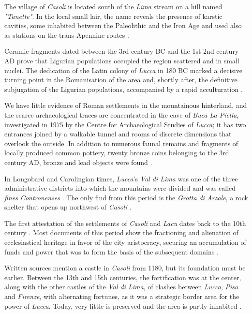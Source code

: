 \documentclass[sustainability,article,submit,pdftex,moreauthors]{Definitions/mdpi}
\begin{document}
 The village of \emph{Casoli} is located south of the \emph{Lima} stream on a hill named {\em "Tanette"}. In the local small lair, the name reveals the presence of karstic cavities, some inhabited between the Paleolithic and the Iron Age and used also as stations on the trans-Apennine routes \cite{men76, gia96, pal63, zec72a, zec72b}.

Ceramic fragments dated between the 3rd century BC and the 1st-2nd century AD prove that Ligurian populations occupied the region scattered and in small nuclei. The dedication of the Latin colony of \textit{Lucca} in 180 BC marked a decisive turning point in the Romanisation of the area and, shortly after, the definitive subjugation of the Ligurian populations, accompanied by a rapid acculturation \cite{gia96, cia05}.

We have little evidence of Roman settlements in the mountainous hinterland, and the scarce archaeological traces are concentrated in the cave of \textit{Buca La Piella}, investigated in 1975 by the Centre for Archaeological Studies of \emph{Lucca}; it has two entrances joined by a walkable tunnel and rooms of discrete dimensions that overlook the outside. In addition to numerous faunal remains and fragments of locally produced common pottery, twenty bronze coins belonging to the 3rd century AD, bronze and lead objects were found \cite{gia96, men81, cia03}. 

In Longobard and Carolingian times, \emph{Lucca}'s \emph{Val di Lima} was one of the three administrative districts into which the mountains were divided and was called \emph{fines Contronenses} \cite{qui02, cia06, cia11}. The only find from this period is the \textit{Grotta di Arzale}, a rock shelter that opens up northwest of \emph{Casoli} \cite{gia96}.

The first attestation of the settlements of \emph{Casoli} and \emph{Lacu} dates back to the 10th century \cite{gia96}. Most documents of this period show the fractioning and alienation of ecclesiastical heritage in favor of the city aristocracy, securing an accumulation of funds and power that was to form the basis of the subsequent domains \cite{qui02, gia96, for12, for15}.

Written sources mention a castle in \emph{Casoli} from 1180, but its foundation must be earlier. Between the 13th and 15th centuries, the fortification was at the center, along with the other castles of the \emph{Val di Lima}, of clashes between \emph{Lucca}, \textit{Pisa} and \emph{Firenze}, with alternating fortunes, as it was a strategic border area for the power of \emph{Lucca}. Today, very little is preserved and the area is partly inhabited \cite{gia96, for12, rom16}.
\end{document}
